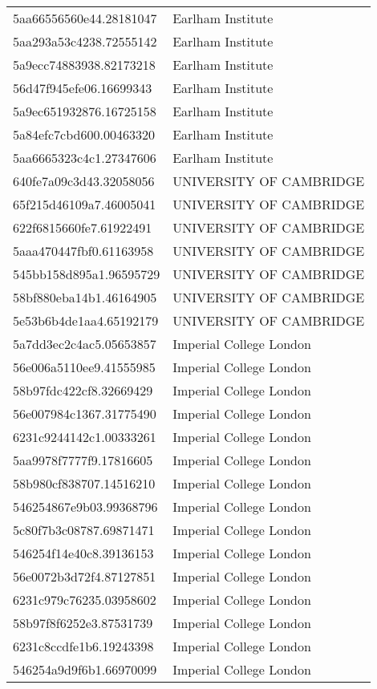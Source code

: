 \begin{tabular}{ll}
5aa66556560e44.28181047 & Earlham Institute \\
5aa293a53c4238.72555142 & Earlham Institute \\
5a9ecc74883938.82173218 & Earlham Institute \\
56d47f945efe06.16699343 & Earlham Institute \\
5a9ec651932876.16725158 & Earlham Institute \\
5a84efc7cbd600.00463320 & Earlham Institute \\
5aa6665323c4c1.27347606 & Earlham Institute \\
640fe7a09c3d43.32058056 & UNIVERSITY OF CAMBRIDGE \\
65f215d46109a7.46005041 & UNIVERSITY OF CAMBRIDGE \\
622f6815660fe7.61922491 & UNIVERSITY OF CAMBRIDGE \\
5aaa470447fbf0.61163958 & UNIVERSITY OF CAMBRIDGE \\
545bb158d895a1.96595729 & UNIVERSITY OF CAMBRIDGE \\
58bf880eba14b1.46164905 & UNIVERSITY OF CAMBRIDGE \\
5e53b6b4de1aa4.65192179 & UNIVERSITY OF CAMBRIDGE \\
5a7dd3ec2c4ac5.05653857 & Imperial College London \\
56e006a5110ee9.41555985 & Imperial College London \\
58b97fdc422cf8.32669429 & Imperial College London \\
56e007984c1367.31775490 & Imperial College London \\
6231c9244142c1.00333261 & Imperial College London \\
5aa9978f7777f9.17816605 & Imperial College London \\
58b980cf838707.14516210 & Imperial College London \\
546254867e9b03.99368796 & Imperial College London \\
5c80f7b3c08787.69871471 & Imperial College London \\
546254f14e40c8.39136153 & Imperial College London \\
56e0072b3d72f4.87127851 & Imperial College London \\
6231c979c76235.03958602 & Imperial College London \\
58b97f8f6252e3.87531739 & Imperial College London \\
6231c8ccdfe1b6.19243398 & Imperial College London \\
546254a9d9f6b1.66970099 & Imperial College London \\

\end{tabular}
